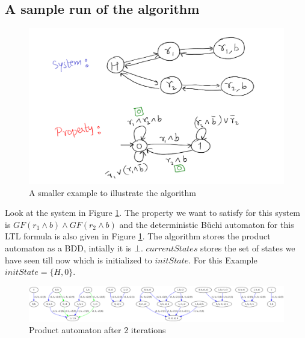 \documentclass{article}
\begin{document}
\subsection{A sample run of the algorithm}
\begin{figure}
	\centering
	\includegraphics[width=\linewidth]{Fig/example} \caption{A smaller example to illustrate the algorithm}
	\label{fig:example}
\end{figure}

Look at the system in Figure \ref{fig:example}. The property we want to satisfy for this system is $G F (r_1 \wedge b) \wedge G F (r_2\wedge b)$ and the deterministic B\"uchi automaton for this LTL formula is also given in Figure \ref{fig:example}. The algorithm stores the product automaton as a BDD, intially it is $\bot$. $currentStates$ stores the set of states we have seen till now which is initialized to $initState$. For this Example $initState=\{H,0\}$.

\begin{figure}
	\centering
	\includegraphics[width=\linewidth]{Fig/product2} \caption{Product automaton after 2 iterations}
	\label{fig:product2}
\end{figure}
\end{document}
